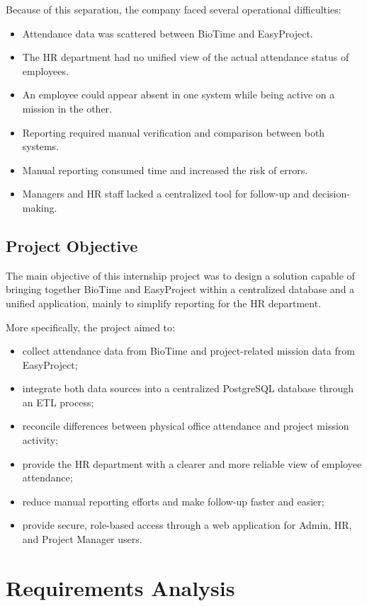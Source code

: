 Because of this separation, the company faced several operational difficulties:
\begin{itemize}[noitemsep]
	\item Attendance data was scattered between BioTime and EasyProject.
	\item The HR department had no unified view of the actual attendance status of employees.
	\item An employee could appear absent in one system while being active on a mission in the other.
	\item Reporting required manual verification and comparison between both systems.
	\item Manual reporting consumed time and increased the risk of errors.
	\item Managers and HR staff lacked a centralized tool for follow-up and decision-making.
\end{itemize}

\subsection{Project Objective}
The main objective of this internship project was to design a solution capable of bringing together BioTime and EasyProject within a centralized database and a unified application, mainly to simplify reporting for the HR department.

More specifically, the project aimed to:
\begin{itemize}[noitemsep]
	\item collect attendance data from BioTime and project-related mission data from EasyProject;
	\item integrate both data sources into a centralized PostgreSQL database through an ETL process;
	\item reconcile differences between physical office attendance and project mission activity;
	\item provide the HR department with a clearer and more reliable view of employee attendance;
	\item reduce manual reporting efforts and make follow-up faster and easier;
	\item provide secure, role-based access through a web application for Admin, HR, and Project Manager users.
\end{itemize}

\section{Requirements Analysis}
